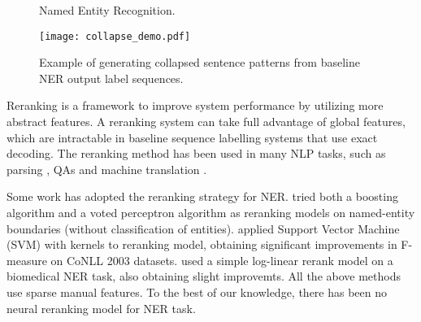 \documentclass[11pt,a4paper]{article}
\begin{document}
\begin{figure}[!t] 
  \caption{Named Entity Recognition.}
  \label{fig:nerdemo}
\end{figure}


\begin{figure*}[htp] 
  \centering 
  \texttt{[image: collapse\_demo.pdf]}
  \caption{Example of generating collapsed sentence patterns from baseline NER output label sequences.}
  \label{fig:collapse}
\end{figure*}

Reranking is a framework to improve system performance by utilizing more abstract features. A reranking system can take full advantage of global features, which are intractable in baseline sequence labelling systems that use exact decoding. The reranking method has been used in many NLP tasks, such as parsing \cite{collins2005discriminative}, QAs \cite{chen2006reranking} and machine translation \cite{wang2007reranking,shen2004discriminative}.

Some work has adopted the reranking strategy for NER.  tried both a boosting algorithm and a voted perceptron algorithm as reranking models on named-entity boundaries (without classification of entities).  applied Support Vector Machine (SVM) with kernels to reranking model, obtaining significant improvements in F-measure on CoNLL 2003 datasets.  used a simple log-linear rerank model on a biomedical NER task, also obtaining slight improvemts. All the above methods use sparse manual features. To the best of our knowledge, there has been no neural reranking model for NER task.
\end{document}
